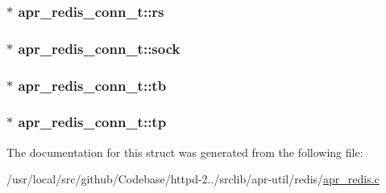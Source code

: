\subsubsection[{\texorpdfstring{rs}{rs}}]{$\ast$ apr\+\_\+redis\+\_\+conn\+\_\+t\+::rs}\hypertarget{structapr__redis__conn__t_aca9d301e5f56568eaeeb7dcac0dfb8cd}{}\label{structapr__redis__conn__t_aca9d301e5f56568eaeeb7dcac0dfb8cd}
\subsubsection[{\texorpdfstring{sock}{sock}}]{$\ast$ apr\+\_\+redis\+\_\+conn\+\_\+t\+::sock}\hypertarget{structapr__redis__conn__t_a6c1b20546f3cf15d2b6ac0c95ce6d3a9}{}\label{structapr__redis__conn__t_a6c1b20546f3cf15d2b6ac0c95ce6d3a9}
\subsubsection[{\texorpdfstring{tb}{tb}}]{$\ast$ apr\+\_\+redis\+\_\+conn\+\_\+t\+::tb}\hypertarget{structapr__redis__conn__t_a3f4ee64e6b98dff1946e7a38eec7257b}{}\label{structapr__redis__conn__t_a3f4ee64e6b98dff1946e7a38eec7257b}
\subsubsection[{\texorpdfstring{tp}{tp}}]{$\ast$ apr\+\_\+redis\+\_\+conn\+\_\+t\+::tp}\hypertarget{structapr__redis__conn__t_a38c0d8b5121191c48db206623cb6e6ff}{}\label{structapr__redis__conn__t_a38c0d8b5121191c48db206623cb6e6ff}


The documentation for this struct was generated from the following file\+:\begin{DoxyCompactItemize}
\item 
/usr/local/src/github/\+Codebase/httpd-\/2../srclib/apr-\/util/redis/\hyperlink{apr__redis_8c}{apr\+\_\+redis.\+c}\end{DoxyCompactItemize}
